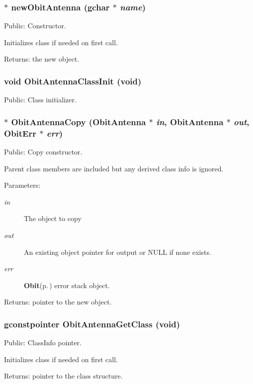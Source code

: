\subsubsection{$\ast$ new\-Obit\-Antenna (gchar $\ast$ {\em name})}\label{ObitAntenna_8h_a4}


Public: Constructor. 

Initializes class if needed on first call. \begin{Desc}
\item[Returns:]the new object. \end{Desc}
\subsubsection{\setlength{\rightskip}{0pt plus 5cm}void Obit\-Antenna\-Class\-Init (void)}\label{ObitAntenna_8h_a3}


Public: Class initializer. 

\subsubsection{$\ast$ Obit\-Antenna\-Copy ({\bf Obit\-Antenna} $\ast$ {\em in}, {\bf Obit\-Antenna} $\ast$ {\em out}, {\bf Obit\-Err} $\ast$ {\em err})}\label{ObitAntenna_8h_a6}


Public: Copy constructor. 

Parent class members are included but any derived class info is ignored. \begin{Desc}
\item[Parameters:]
\begin{description}
\item[{\em in}]The object to copy \item[{\em out}]An existing object pointer for output or NULL if none exists. \item[{\em err}]{\bf Obit}{\rm (p.\,\pageref{structObit})} error stack object. \end{description}
\end{Desc}
\begin{Desc}
\item[Returns:]pointer to the new object. \end{Desc}
\subsubsection{\setlength{\rightskip}{0pt plus 5cm}gconstpointer Obit\-Antenna\-Get\-Class (void)}\label{ObitAntenna_8h_a5}


Public: Class\-Info pointer. 

Initializes class if needed on first call. \begin{Desc}
\item[Returns:]pointer to the class structure. \end{Desc}
